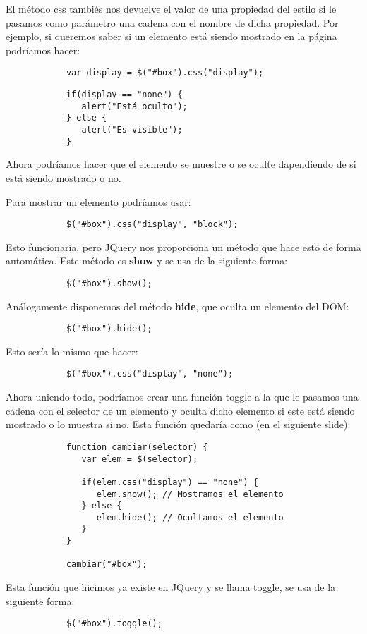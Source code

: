 \documentclass[10pt]{beamer}
\begin{document}
\begin{frame}[fragile]
	\pause El método css tambiés nos devuelve el valor de una propiedad del estilo si le pasamos como parámetro una cadena
		con el nombre de dicha propiedad. Por ejemplo, si queremos saber si un elemento está siendo mostrado en la página
		podríamos hacer:
	\pause \begin{lstlisting}
			var display = $("#box").css("display");
		\end{lstlisting}
	\pause \begin{lstlisting}
			if(display == "none") {
			   alert("Está oculto");
			} else {
			   alert("Es visible");
			}
		\end{lstlisting}
	
	\pause Ahora podríamos hacer que el elemento se muestre o se oculte dapendiendo de si está siendo mostrado o no.
	
	\pause Para mostrar un elemento podríamos usar:
	\pause \begin{lstlisting}
			$("#box").css("display", "block");
		\end{lstlisting}
	\pause Esto funcionaría, pero JQuery nos proporciona un método que hace esto de forma automática. Este método es
		\textbf{show} y se usa de la siguiente forma:
	\pause \begin{lstlisting}
			$("#box").show();
		\end{lstlisting}
\end{frame}

\begin{frame}[fragile]
	\pause Análogamente disponemos del método \textbf{hide}, que oculta un elemento del DOM:
	\pause \begin{lstlisting}
			$("#box").hide();
		\end{lstlisting}
	\pause Esto sería lo mismo que hacer:
	\pause \begin{lstlisting}
			$("#box").css("display", "none");
		\end{lstlisting}
	
	\pause Ahora uniendo todo, podríamos crear una función toggle a la que le pasamos una cadena con el
		selector de un elemento y oculta dicho elemento si este está siendo mostrado o lo muestra si no.
		Esta función quedaría como (en el siguiente slide): 
\end{frame}

\begin{frame}[fragile]
 \pause \begin{lstlisting}
			function cambiar(selector) {
			   var elem = $(selector);
			   
			   if(elem.css("display") == "none") {
			      elem.show(); // Mostramos el elemento
			   } else {
			      elem.hide(); // Ocultamos el elemento
			   }
			}
			
			cambiar("#box");
		\end{lstlisting}
	\pause Esta función que hicimos ya existe en JQuery y se llama toggle, se usa de la siguiente forma:
	\pause \begin{lstlisting}
			$("#box").toggle();
		\end{lstlisting}
\end{frame}
\end{document}
